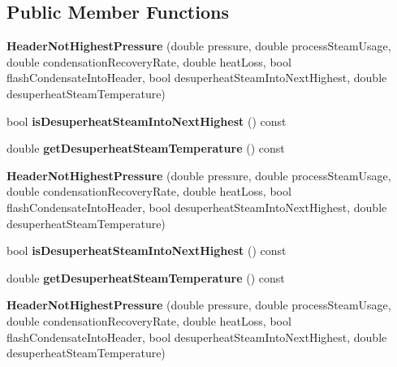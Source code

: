 \subsection*{Public Member Functions}
\begin{DoxyCompactItemize}
\item 
\mbox{\label{class_header_not_highest_pressure_aca7f4af569a5632ea2335a26c2bd3047}} 
{\bfseries Header\+Not\+Highest\+Pressure} (double pressure, double process\+Steam\+Usage, double condensation\+Recovery\+Rate, double heat\+Loss, bool flash\+Condensate\+Into\+Header, bool desuperheat\+Steam\+Into\+Next\+Highest, double desuperheat\+Steam\+Temperature)
\item 
\mbox{\label{class_header_not_highest_pressure_af4178100c3856d70293fdbd3dfea7c74}} 
bool {\bfseries is\+Desuperheat\+Steam\+Into\+Next\+Highest} () const
\item 
\mbox{\label{class_header_not_highest_pressure_a773589763baa84fc50e0e4b20f473e4c}} 
double {\bfseries get\+Desuperheat\+Steam\+Temperature} () const
\item 
\mbox{\label{class_header_not_highest_pressure_aca7f4af569a5632ea2335a26c2bd3047}} 
{\bfseries Header\+Not\+Highest\+Pressure} (double pressure, double process\+Steam\+Usage, double condensation\+Recovery\+Rate, double heat\+Loss, bool flash\+Condensate\+Into\+Header, bool desuperheat\+Steam\+Into\+Next\+Highest, double desuperheat\+Steam\+Temperature)
\item 
\mbox{\label{class_header_not_highest_pressure_af4178100c3856d70293fdbd3dfea7c74}} 
bool {\bfseries is\+Desuperheat\+Steam\+Into\+Next\+Highest} () const
\item 
\mbox{\label{class_header_not_highest_pressure_a773589763baa84fc50e0e4b20f473e4c}} 
double {\bfseries get\+Desuperheat\+Steam\+Temperature} () const
\item 
\mbox{\label{class_header_not_highest_pressure_aca7f4af569a5632ea2335a26c2bd3047}} 
{\bfseries Header\+Not\+Highest\+Pressure} (double pressure, double process\+Steam\+Usage, double condensation\+Recovery\+Rate, double heat\+Loss, bool flash\+Condensate\+Into\+Header, bool desuperheat\+Steam\+Into\+Next\+Highest, double desuperheat\+Steam\+Temperature)

\end{DoxyCompactItemize}

